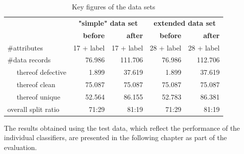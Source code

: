 \begin{table}[ht]
\centering
\caption{Key figures of the data sets}
\label{tab:dataset-numbers-new}
\begin{tabular}{|l|r|r|r|r|} 
\hline
\multirow{2}{*}{}    & \multicolumn{2}{c|}{\textbf{"simple" data set}} & \multicolumn{2}{c|}{\textbf{extended data set}}  \\ 
\cline{2-5}
                     & \textbf{before} & \textbf{after}                & \textbf{before} & \textbf{after}                 \\ 
\hline
\#attributes         & 17 + label      & 17 + label                    & 28 + label      & 28 + label                     \\ 
\hline
\#data records       & 76.986          & 111.706                       & 76.986          & 112.706                        \\ 
\hline
~ ~thereof defective & 1.899           & 37.619                        & 1.899           & 37.619                         \\ 
\hline
~ ~thereof clean     & 75.087          & 75.087                        & 75.087          & 75.087                         \\ 
\hline
~ ~thereof unique    & 52.564          & 86.155                        & 52.783          & 86.381                         \\ 
\hline
overall split ratio  & 71:29           & 81:19                         & 71:29           & 81:19                          \\
\hline
\end{tabular}
\end{table}

The results obtained using the test data, which reflect the performance of the individual classifiers, are presented in the following chapter as part of the evaluation.